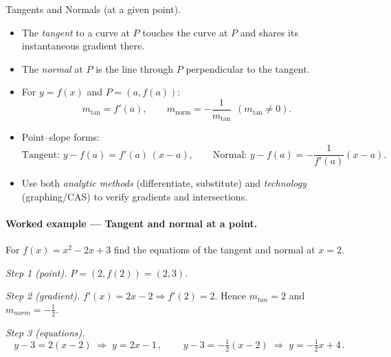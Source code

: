 \documentclass[11pt]{article}
\def\textbf#1{#1}%
\def\mathrm#1{#1}%
\begin{document}
\textbf{Tangents and Normals (at a given point).}
\begin{itemize}[itemsep=2pt]
  \item The \emph{tangent} to a curve at $P$ touches the curve at $P$ and shares its instantaneous gradient there.
  \item The \emph{normal} at $P$ is the line through $P$ perpendicular to the tangent.
  \item For $y=f(x)$ and $P=(a,f(a))$:
    \[
      m_{\text{tan}}=f'(a),\qquad 
      m_{\text{norm}}=-\frac{1}{m_{\text{tan}}}\ \ (m_{\text{tan}}\neq 0).
    \]
  \item Point–slope forms:
    \[
      \text{Tangent: } y-f(a)=f'(a)\,(x-a),\qquad
      \text{Normal: } y-f(a)=-\frac{1}{f'(a)}(x-a).
    \]
  \item Use both \emph{analytic methods} (differentiate, substitute) and \emph{technology}
        (graphing/CAS) to verify gradients and intersections.
\end{itemize}


\paragraph*{Worked example — Tangent and normal at a point.}
For \(f(x)=x^{2}-2x+3\) find the equations of the tangent and normal at \(x=2\).

\emph{Step 1 (point).} \(P=(2,f(2))=(2,3)\).

\emph{Step 2 (gradient).} \(f'(x)=2x-2\Rightarrow f'(2)=2\).
Hence \(m_{\mathrm{tan}}=2\) and \(m_{\mathrm{norm}}=-\tfrac12\).

\emph{Step 3 (equations).}
\[
\boxed{\,y-3=2(x-2)\;\Rightarrow\; y=2x-1\,},\qquad
\boxed{\,y-3=-\tfrac12(x-2)\;\Rightarrow\; y=-\tfrac12x+4\,}.
\]
\end{document}
